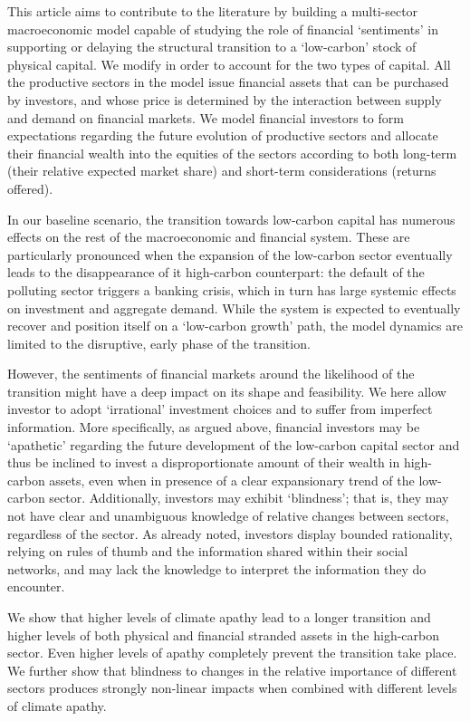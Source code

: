\documentclass[authoryear]{article}
\begin{document}
This article aims to contribute to the literature by building a multi-sector macroeconomic model capable of studying the role of financial `sentiments' in supporting or delaying the structural transition to a `low-carbon' stock of physical capital. We modify \citet{Caiani2014} in order to account for the two types of capital. All the productive sectors in the model issue financial assets that can be purchased by investors, and whose price is determined by the interaction between supply and demand on financial markets. We model financial investors to form expectations regarding the future evolution of productive sectors and allocate their financial wealth into the equities of the sectors according to both long-term (their relative expected market share) and short-term considerations (returns offered).

In our baseline scenario, the transition towards low-carbon capital has numerous effects on the rest of the macroeconomic and financial system. These are particularly pronounced when the expansion of the low-carbon sector eventually leads to the disappearance of it high-carbon counterpart: the default of the polluting sector triggers a banking crisis, which in turn has large systemic effects on investment and aggregate demand. While the system is expected to eventually recover and position itself on a `low-carbon growth' path, the model dynamics are limited to the disruptive, early phase of the transition.

However, the sentiments of financial markets around the likelihood of the transition might have a deep impact on its shape and feasibility. We here allow investor to adopt `irrational' investment choices and to suffer from imperfect information. More specifically, as argued above, financial investors may be `apathetic' regarding the future development of the low-carbon capital sector and thus be inclined to invest a disproportionate amount of their wealth in high-carbon assets, even when in presence of a clear expansionary trend of the low-carbon sector. Additionally, investors may exhibit `blindness'; that is, they may not have clear and unambiguous knowledge of relative changes between sectors, regardless of the sector. As already noted, investors display bounded rationality, relying on rules of thumb and the information shared within their social networks, and may lack the knowledge to interpret the information they do encounter.

We show that higher levels of  climate apathy lead to a longer transition and higher levels of both physical and financial stranded assets in the high-carbon sector. Even higher levels of apathy completely prevent the transition take place. We further show that blindness to changes in the relative importance of different sectors produces strongly non-linear impacts when combined with different levels of climate apathy. 
\end{document}
